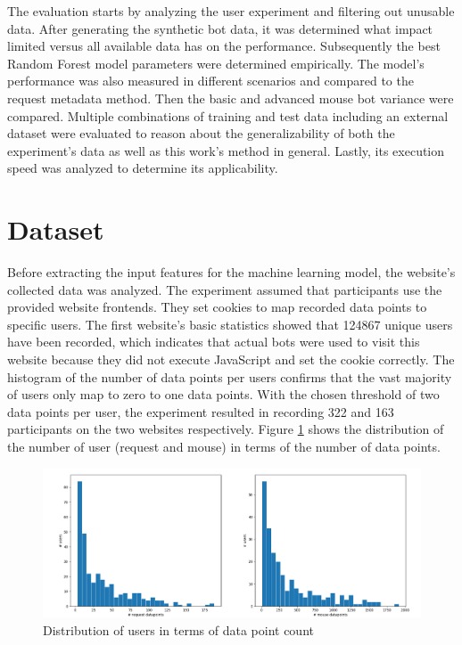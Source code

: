 \documentclass[
    fontsize=12pt,
    headings=small,
    parskip=half,           %
    bibliography=totoc,
    numbers=noenddot,       %
    open=any,               %
    final,                   %
    table
]{scrreprt}
\begin{document}
The evaluation starts by analyzing the user experiment and filtering out unusable data. After generating the synthetic bot data, it was determined what impact limited versus all available data has on the performance. Subsequently the best Random Forest model parameters were determined empirically. The model's performance was also measured in different scenarios and compared to the request metadata method. Then the basic and advanced mouse bot variance were compared. Multiple combinations of training and test data including an external dataset were evaluated to reason about the generalizability of both the experiment's data as well as this work's method in general. Lastly, its execution speed was analyzed to determine its applicability.

\section{Dataset}

Before extracting the input features for the machine learning model, the website's collected data was analyzed. The experiment assumed that participants use the provided website frontends. They set cookies to map recorded data points to specific users. The first website's basic statistics showed that 124867 unique users have been recorded, which indicates that actual bots were used to visit this website because they did not execute JavaScript and set the cookie correctly. The histogram of the number of data points per users confirms that the vast majority of users only map to zero to one data points. With the chosen threshold of two data points per user, the experiment resulted in recording 322 and 163 participants on the two websites respectively. Figure \ref{fig:user_dp_hist} shows the distribution of the number of user (request and mouse) in terms of the number of data points.

\begin{figure}[h]
    \includegraphics[width=\textwidth]{figures/user_dp_hist.png}
    \caption{Distribution of users in terms of data point count}
    \label{fig:user_dp_hist}
\end{figure}
\end{document}
